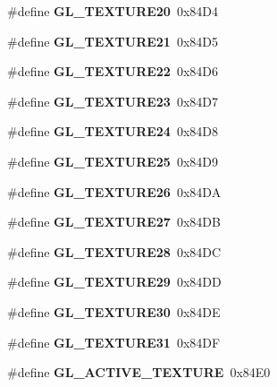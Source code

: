 \begin{DoxyCompactItemize}
\item 
\#define {\bfseries G\+L\+\_\+\+T\+E\+X\+T\+U\+R\+E20}~0x84\+D4\label{_s_d_l__opengl_8h_a3a0a7bc78dccb9b36c17a8ec664473f8}

\item 
\#define {\bfseries G\+L\+\_\+\+T\+E\+X\+T\+U\+R\+E21}~0x84\+D5\label{_s_d_l__opengl_8h_ad3cc84e18c6e199a24ab0ca59741f13e}

\item 
\#define {\bfseries G\+L\+\_\+\+T\+E\+X\+T\+U\+R\+E22}~0x84\+D6\label{_s_d_l__opengl_8h_ad7bb0cc4784c49d1eb83c8d09e06c9c0}

\item 
\#define {\bfseries G\+L\+\_\+\+T\+E\+X\+T\+U\+R\+E23}~0x84\+D7\label{_s_d_l__opengl_8h_a8e98a806da366c64ec10765b122ecf1d}

\item 
\#define {\bfseries G\+L\+\_\+\+T\+E\+X\+T\+U\+R\+E24}~0x84\+D8\label{_s_d_l__opengl_8h_a3ad5b3e82f51885b0ebc604e54b624f0}

\item 
\#define {\bfseries G\+L\+\_\+\+T\+E\+X\+T\+U\+R\+E25}~0x84\+D9\label{_s_d_l__opengl_8h_affa8df39d0f4c718934bc194a118babb}

\item 
\#define {\bfseries G\+L\+\_\+\+T\+E\+X\+T\+U\+R\+E26}~0x84\+D\+A\label{_s_d_l__opengl_8h_a7097b44e05a237ba70bd11ba1ead56b8}

\item 
\#define {\bfseries G\+L\+\_\+\+T\+E\+X\+T\+U\+R\+E27}~0x84\+D\+B\label{_s_d_l__opengl_8h_a3cc96950e9132633e9f7b7610c990d53}

\item 
\#define {\bfseries G\+L\+\_\+\+T\+E\+X\+T\+U\+R\+E28}~0x84\+D\+C\label{_s_d_l__opengl_8h_a07ec904516d5981c54dc4ffb9654a86f}

\item 
\#define {\bfseries G\+L\+\_\+\+T\+E\+X\+T\+U\+R\+E29}~0x84\+D\+D\label{_s_d_l__opengl_8h_a4ac3541defe5f96fa06dd57f0a8891b2}

\item 
\#define {\bfseries G\+L\+\_\+\+T\+E\+X\+T\+U\+R\+E30}~0x84\+D\+E\label{_s_d_l__opengl_8h_a78da9f28544559f2bfccf8a9d43a406e}

\item 
\#define {\bfseries G\+L\+\_\+\+T\+E\+X\+T\+U\+R\+E31}~0x84\+D\+F\label{_s_d_l__opengl_8h_adbb8b4ec84d0ddb49ebc9c2290c8be20}

\item 
\#define {\bfseries G\+L\+\_\+\+A\+C\+T\+I\+V\+E\+\_\+\+T\+E\+X\+T\+U\+R\+E}~0x84\+E0\label{_s_d_l__opengl_8h_a6fc1b36f39e5859ac72ebfaf3722a0c1}


\end{DoxyCompactItemize}
